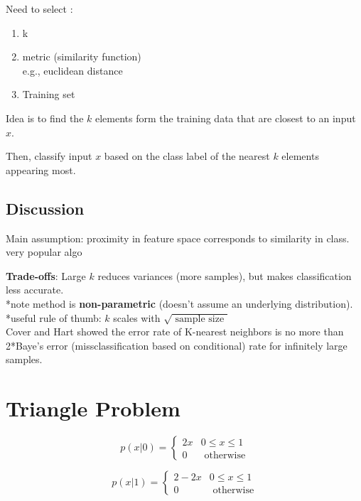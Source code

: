 \documentclass[12pt]{article}
\newcommand{\bt}[1]{\textbf{#1}} %
\begin{document}
Need to select : 
\begin{enumerate}
    \item k 
    \item metric (similarity function)\\
    e.g., euclidean distance
    \item Training set
\end{enumerate}

Idea is to find the $k$ elements form the training data that are closest to an input $x$.

Then, classify input $x$ based on the class label of the nearest $k$ elements appearing most.
\subsection*{Discussion}

Main assumption: proximity in feature space corresponds to similarity in class. \\

very popular algo

\bt{Trade-offs}: Large $k$ reduces variances (more samples), but makes classification less accurate.\\

*note method is \bt{non-parametric} (doesn't assume an underlying distribution).\\

*useful rule of thumb: $k$ scales with $\sqrt{\text{ sample size }}$\\



Cover and Hart showed the error rate of K-nearest neighbors is no more than 2*Baye's error (missclassification based on conditional) rate for infinitely large samples.

\section*{Triangle Problem}

\begin{displaymath}
   p(x | 0) = \left\{
     \begin{array}{lr}
       2x &  0 \leq x \leq 1 \\
       0 & \text{ otherwise}
     \end{array}
   \right.
\end{displaymath} 


\begin{displaymath}
   p(x | 1) = \left\{
     \begin{array}{lr}
       2 - 2x &  0 \leq x \leq 1 \\
       0 & \text{ otherwise}
     \end{array}
   \right.
\end{displaymath} 
\end{document}
